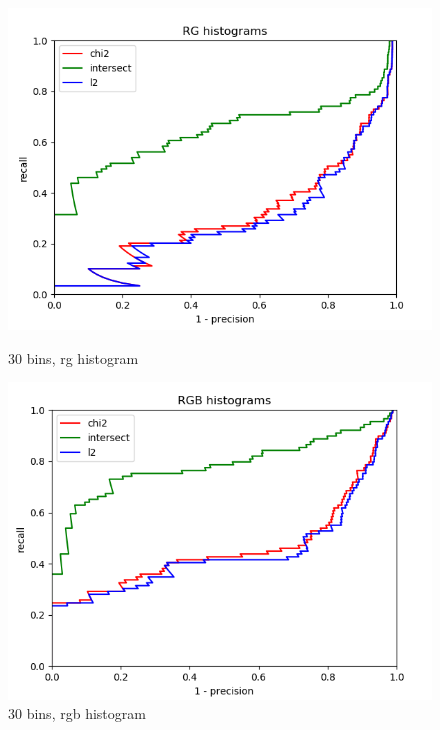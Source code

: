 \documentclass{article}
\begin{document}
\begin{figure}[ht]
    \centering
        \begin{minipage}{.5\textwidth}
        \includegraphics[width=\linewidth]{images/Q4.b-rg_histogram_30_bins.png}
        \caption{30 bins, rg histogram}
    \end{minipage}\hfill
    \begin{minipage}{.5\textwidth}
        \includegraphics[width=\linewidth]{images/Q4.b-rgb_histogram_30_bins.png}
        \caption{30 bins, rgb histogram}
    \end{minipage}
    \begin{minipage}{.5\textwidth}

\end{minipage}
\end{figure}
\end{document}
